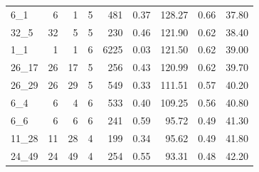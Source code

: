 \begin{table}[ht]
\begin{tabular}{lrrrrrrrr}
  6_1 &   6 &   1 &   5 & 481 & 0.37 & 128.27 & 0.66 & 37.80 \\ 
  32_5 &  32 &   5 &   5 & 230 & 0.46 & 121.90 & 0.62 & 38.40 \\ 
  1_1 &   1 &   1 &   6 & 6225 & 0.03 & 121.50 & 0.62 & 39.00 \\ 
  26_17 &  26 &  17 &   5 & 256 & 0.43 & 120.99 & 0.62 & 39.70 \\ 
  26_29 &  26 &  29 &   5 & 549 & 0.33 & 111.51 & 0.57 & 40.20 \\ 
  6_4 &   6 &   4 &   6 & 533 & 0.40 & 109.25 & 0.56 & 40.80 \\ 
  6_6 &   6 &   6 &   6 & 241 & 0.59 & 95.72 & 0.49 & 41.30 \\ 
  11_28 &  11 &  28 &   4 & 199 & 0.34 & 95.62 & 0.49 & 41.80 \\ 
  24_49 &  24 &  49 &   4 & 254 & 0.55 & 93.31 & 0.48 & 42.20 \\ 
   \bottomrule
\end{tabular}
\end{table}
